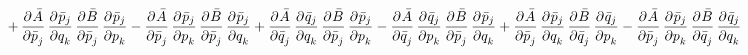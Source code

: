 \documentclass[11pt, ngerman, fleqn, DIV=15, headinclude, BCOR=1cm]{scrartcl}
\begin{document}
\begin{align*}
        + \dpd{\bar A}{\bar p_j} \dpd{\bar p_j}{q_k}
        \dpd{\bar B}{\bar p_j} \dpd{\bar p_j}{p_k}
        - \dpd{\bar A}{\bar p_j} \dpd{\bar p_j}{p_k}
        \dpd{\bar B}{\bar p_j} \dpd{\bar p_j}{q_k}

        + \dpd{\bar A}{\bar q_j} \dpd{\bar q_j}{q_k} %
        \dpd{\bar B}{\bar p_j} \dpd{\bar p_j}{p_k} %
        - \dpd{\bar A}{\bar q_j} \dpd{\bar q_j}{p_k} %
        \dpd{\bar B}{\bar p_j} \dpd{\bar p_j}{q_k} %

        + \dpd{\bar A}{\bar p_j} \dpd{\bar p_j}{q_k} %
        \dpd{\bar B}{\bar q_j} \dpd{\bar q_j}{p_k} %
        - \dpd{\bar A}{\bar p_j} \dpd{\bar p_j}{p_k} %
        \dpd{\bar B}{\bar q_j} \dpd{\bar q_j}{q_k} %

\end{align*}
\end{document}
